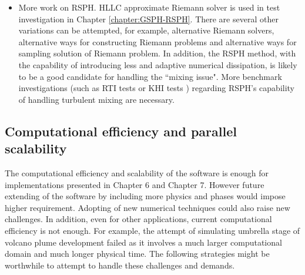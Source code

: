 \begin{itemize}
\item More work on RSPH. HLLC approximate Riemann solver is used in test investigation in Chapter \ref{chapter:GSPH-RSPH}. There are several other variations can be attempted, for example, alternative Riemann solvers, alternative ways for constructing Riemann problems and alternative ways for sampling solution of Riemann problem. In addition, the RSPH method, with the capability of introducing less and adaptive numerical dissipation, is likely to be a good candidate for handling the ``mixing issue". More benchmark investigations (such as RTI tests or KHI tests \citep{price2008modelling,cha2010kelvin}) regarding RSPH's capability of handling turbulent mixing are necessary.
\end{itemize}

\subsection{Computational efficiency and parallel scalability}
The computational efficiency and scalability of the software is enough for implementations presented in Chapter 6 and Chapter 7. However future extending of the software by including more physics and phases would impose higher requirement. Adopting of new numerical techniques could also raise new challenges. In addition, even for other applications, current computational efficiency is not enough. For example, the attempt of simulating umbrella stage of volcano plume development failed as it involves a much larger computational domain and much longer physical time. The following strategies might be worthwhile to attempt to handle these challenges and demands. 

